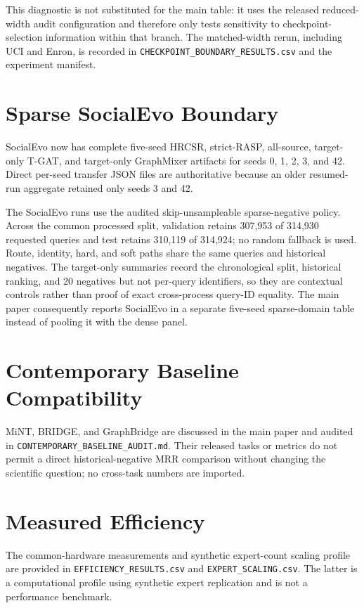 \documentclass[conference]{IEEEtran}
\begin{document}
This diagnostic is not substituted for the main table: it uses the released
reduced-width audit configuration and therefore only tests sensitivity to
checkpoint-selection information within that branch. The matched-width rerun,
including UCI and Enron, is recorded in
\texttt{CHECKPOINT\_BOUNDARY\_RESULTS.csv} and the experiment manifest.

\section{Sparse SocialEvo Boundary}
SocialEvo now has complete five-seed HRCSR, strict-RASP, all-source,
target-only T-GAT, and target-only GraphMixer artifacts for seeds 0, 1, 2, 3,
and 42. Direct per-seed transfer JSON files are authoritative because an
older resumed-run aggregate retained only seeds 3 and 42.

The SocialEvo runs use the audited skip-unsampleable sparse-negative policy.
Across the common processed split, validation retains 307,953 of 314,930
requested queries and test retains 310,119 of 314,924; no random fallback is
used.  Route, identity, hard, and soft paths share the same queries and
historical negatives.  The target-only summaries record the chronological
split, historical ranking, and 20 negatives but not per-query identifiers, so
they are contextual controls rather than proof of exact cross-process query-ID
equality.  The main paper consequently reports SocialEvo in a separate
five-seed sparse-domain table instead of pooling it with the dense panel.

\section{Contemporary Baseline Compatibility}
MiNT, BRIDGE, and GraphBridge are discussed in the main paper and audited in
\texttt{CONTEMPORARY\_BASELINE\_AUDIT.md}. Their released tasks or metrics do
not permit a direct historical-negative MRR comparison without changing the
scientific question; no cross-task numbers are imported.

\section{Measured Efficiency}
The common-hardware measurements and synthetic expert-count scaling profile
are provided in \texttt{EFFICIENCY\_RESULTS.csv} and
\texttt{EXPERT\_SCALING.csv}. The latter is a computational profile using
synthetic expert replication and is not a performance benchmark.
\end{document}
